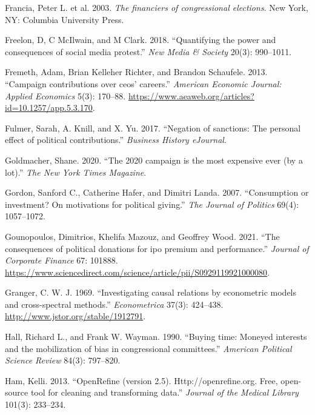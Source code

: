 \documentclass[12pt,]{article}
\begin{document}
\leavevmode\hypertarget{ref-francia2003}{}%
Francia, Peter L. et al. 2003. \emph{The financiers of congressional
elections}. New York, NY: Columbia University Press.

\leavevmode\hypertarget{ref-freelon2018}{}%
Freelon, D, C McIlwain, and M Clark. 2018. ``Quantifying the power and
consequences of social media protest.'' \emph{New Media \& Society}
20(3): 990--1011.

\leavevmode\hypertarget{ref-fremeth2013}{}%
Fremeth, Adam, Brian Kelleher Richter, and Brandon Schaufele. 2013.
``Campaign contributions over ceos' careers.'' \emph{American Economic
Journal: Applied Economics} 5(3): 170--88.
\url{https://www.aeaweb.org/articles?id=10.1257/app.5.3.170}.

\leavevmode\hypertarget{ref-fulmer2017}{}%
Fulmer, Sarah, A. Knill, and X. Yu. 2017. ``Negation of sanctions: The
personal effect of political contributions.'' \emph{Business History
eJournal}.

\leavevmode\hypertarget{ref-goldmacher2020}{}%
Goldmacher, Shane. 2020. ``The 2020 campaign is the most expensive ever
(by a lot).'' \emph{The New York Times Magazine}.

\leavevmode\hypertarget{ref-gordon2007}{}%
Gordon, Sanford C., Catherine Hafer, and Dimitri Landa. 2007.
``Consumption or investment? On motivations for political giving.''
\emph{The Journal of Politics} 69(4): 1057--1072.

\leavevmode\hypertarget{ref-gounopoulos2021}{}%
Gounopoulos, Dimitrios, Khelifa Mazouz, and Geoffrey Wood. 2021. ``The
consequences of political donations for ipo premium and performance.''
\emph{Journal of Corporate Finance} 67: 101888.
\url{https://www.sciencedirect.com/science/article/pii/S0929119921000080}.

\leavevmode\hypertarget{ref-granger}{}%
Granger, C. W. J. 1969. ``Investigating causal relations by econometric
models and cross-spectral methods.'' \emph{Econometrica} 37(3):
424--438. \url{http://www.jstor.org/stable/1912791}.

\leavevmode\hypertarget{ref-hall1990}{}%
Hall, Richard L., and Frank W. Wayman. 1990. ``Buying time: Moneyed
interests and the mobilization of bias in congressional committees.''
\emph{American Political Science Review} 84(3): 797--820.

\leavevmode\hypertarget{ref-openrefine}{}%
Ham, Kelli. 2013. ``OpenRefine (version 2.5). Http://openrefine.org.
Free, open-source tool for cleaning and transforming data.''
\emph{Journal of the Medical Library} 101(3): 233--234.
\end{document}
